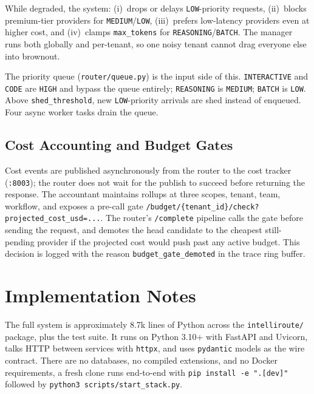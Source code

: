 \documentclass[conference,letterpaper]{IEEEtran}
\begin{document}
While degraded, the system: (i)~drops or delays \texttt{LOW}-priority
requests, (ii)~blocks premium-tier providers for
\texttt{MEDIUM}/\texttt{LOW}, (iii)~prefers low-latency providers
even at higher cost, and (iv)~clamps \texttt{max\_tokens} for
\texttt{REASONING}/\texttt{BATCH}. The manager runs both globally
and per-tenant, so one noisy tenant cannot drag everyone else into
brownout.

The priority queue (\texttt{router/queue.py}) is the input side of
this. \texttt{INTERACTIVE} and \texttt{CODE} are \texttt{HIGH} and
bypass the queue entirely; \texttt{REASONING} is \texttt{MEDIUM};
\texttt{BATCH} is \texttt{LOW}. Above \texttt{shed\_threshold}, new
\texttt{LOW}-priority arrivals are shed instead of enqueued. Four
async worker tasks drain the queue.

\subsection{Cost Accounting and Budget Gates}
Cost events are published asynchronously from the router to the
cost tracker (\texttt{:8003}); the router does not wait for the
publish to succeed before returning the response. The accountant
maintains rollups at three scopes, tenant, team, workflow, and
exposes a pre-call gate \texttt{/budget/\{tenant\_id\}/check?
projected\_cost\_usd=...}. The router's \texttt{/complete} pipeline
calls the gate before sending the request, and demotes the head
candidate to the cheapest still-pending provider if the projected
cost would push past any active budget. This decision is logged with
the reason \texttt{budget\_gate\_demoted} in the trace ring buffer.

\section{Implementation Notes}\label{sec:impl}
The full system is approximately 8.7k lines of Python across the
\texttt{intelliroute/} package, plus the test suite. It runs on
Python 3.10+ with FastAPI and Uvicorn, talks HTTP between services
with \texttt{httpx}, and uses \texttt{pydantic} models as the wire
contract. There are no databases, no compiled extensions, and no
Docker requirements, a fresh clone runs end-to-end with
\texttt{pip install -e ".[dev]"} followed by
\texttt{python3 scripts/start\_stack.py}.
\end{document}
